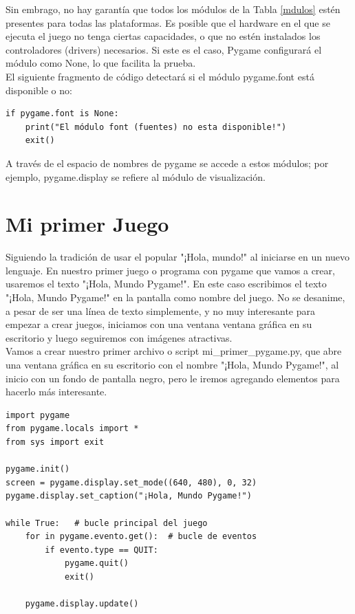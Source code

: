 Sin embrago, no hay garantía que todos los módulos de la Tabla \ref{mdulos} estén presentes para todas las plataformas. Es
posible que el hardware en el que se ejecuta el juego no tenga ciertas capacidades, o que no estén instalados los controladores (drivers) necesarios. Si este es el caso, Pygame configurará el módulo como {\ttfamily None}, lo que facilita la prueba. \\

El siguiente fragmento de código detectará si el módulo {\ttfamily pygame.font} está disponible o no:
\begin{lstlisting}
if pygame.font is None:
    print("El módulo font (fuentes) no esta disponible!")
    exit()	
\end{lstlisting}

A través de el espacio de nombres de {\ttfamily pygame} se accede a estos módulos; por ejemplo, {\ttfamily pygame.display} se refiere al módulo de visualización.

\section{Mi primer Juego}

Siguiendo la tradición de usar el popular "¡Hola, mundo!"{} al iniciarse en un nuevo lenguaje. En nuestro primer juego o programa con {\ttfamily pygame} que vamos a crear, usaremos el texto "¡Hola, Mundo Pygame!"{}. En este caso escribimos el texto "¡Hola, Mundo Pygame!"{} en la pantalla como nombre del juego. No se desanime, a  pesar de ser una línea de texto simplemente, y no  muy interesante para empezar a crear juegos, iniciamos con una ventana ventana gráfica en su escritorio y luego seguiremos con  imágenes atractivas. \\

Vamos a crear nuestro primer archivo o script {\ttfamily mi\_primer\_pygame.py},  que abre una ventana gráfica en su escritorio
con el nombre "¡Hola, Mundo Pygame!"{}, al inicio con un fondo de pantalla negro, pero le iremos agregando elementos para hacerlo más interesante.
 
 
\hspace{-2.9cm}{\ttfamily \scriptsize mi\_primer}
 
\vspace{-0.2cm}
\hspace{-2.5cm}{\ttfamily \scriptsize \_pygame.py}\vspace{-0.84cm}
\begin{lstlisting}	
import pygame
from pygame.locals import *
from sys import exit
 	
pygame.init()
screen = pygame.display.set_mode((640, 480), 0, 32)
pygame.display.set_caption("¡Hola, Mundo Pygame!")
 	
while True:   # bucle principal del juego
    for in pygame.evento.get():  # bucle de eventos
        if evento.type == QUIT:
            pygame.quit()
            exit()
    
    pygame.display.update()	
\end{lstlisting}



